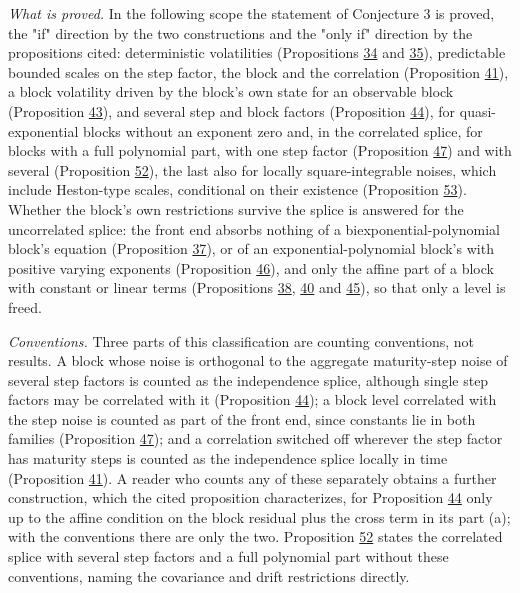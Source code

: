 \documentclass[11pt]{article}
\begin{document}
\emph{What is proved.} In the following scope the statement of Conjecture 3 is proved, the "if" direction by the two constructions and the "only if" direction by the propositions cited: deterministic volatilities (Propositions \hyperref[res:Proposition-34]{34} and \hyperref[res:Proposition-35]{35}), predictable bounded scales on the step factor, the block and the correlation (Proposition \hyperref[res:Proposition-41]{41}), a block volatility driven by the block's own state for an observable block (Proposition \hyperref[res:Proposition-43]{43}), and several step and block factors (Proposition \hyperref[res:Proposition-44]{44}), for quasi-exponential blocks without an exponent zero and, in the correlated splice, for blocks with a full polynomial part, with one step factor (Proposition \hyperref[res:Proposition-47]{47}) and with several (Proposition \hyperref[res:Proposition-52]{52}), the last also for locally square-integrable noises, which include Heston-type scales, conditional on their existence (Proposition \hyperref[res:Proposition-53]{53}). Whether the block's own restrictions survive the splice is answered for the uncorrelated splice: the front end absorbs nothing of a biexponential-polynomial block's equation (Proposition \hyperref[res:Proposition-37]{37}), or of an exponential-polynomial block's with positive varying exponents (Proposition \hyperref[res:Proposition-46]{46}), and only the affine part of a block with constant or linear terms (Propositions \hyperref[res:Proposition-38]{38}, \hyperref[res:Proposition-40]{40} and \hyperref[res:Proposition-45]{45}), so that only a level is freed.

\emph{Conventions.} Three parts of this classification are counting conventions, not results. A block whose noise is orthogonal to the aggregate maturity-step noise of several step factors is counted as the independence splice, although single step factors may be correlated with it (Proposition \hyperref[res:Proposition-44]{44}); a block level correlated with the step noise is counted as part of the front end, since constants lie in both families (Proposition \hyperref[res:Proposition-47]{47}); and a correlation switched off wherever the step factor has maturity steps is counted as the independence splice locally in time (Proposition \hyperref[res:Proposition-41]{41}). A reader who counts any of these separately obtains a further construction, which the cited proposition characterizes, for Proposition \hyperref[res:Proposition-44]{44} only up to the affine condition on the block residual plus the cross term in its part (a); with the conventions there are only the two. Proposition \hyperref[res:Proposition-52]{52} states the correlated splice with several step factors and a full polynomial part without these conventions, naming the covariance and drift restrictions directly.
\end{document}
